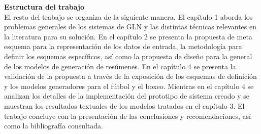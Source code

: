 
    \textbf{Estructura del trabajo}\\

    El resto del trabajo se organiza de la siguiente manera. El capítulo 1 aborda los problemas generales de los sistemas de GLN 
y las distintas técnicas relevantes en la literatura para su solución. En el capítulo 2 se presenta la propuesta de meta esquema para la 
representación de los datos de entrada, la metodología para definir los esquemas específicos, así como la propuesta de diseño para la 
general de los modelos de generación de resúmenes. En el capítulo 4 se presenta la validación
de la propuesta a través de la exposición de los esquemas de definición y los modelos generadores para el fútbol y el boxeo. 
Mientras en el capítulo 4 se analizan los detalles de la implementación del prototipo de sistema creado y se muestran los resultados 
textuales de los modelos tratados en el capítulo 3. El trabajo concluye con la presentación de las 
conclusiones y recomendaciones, así como la bibliografía consultada.